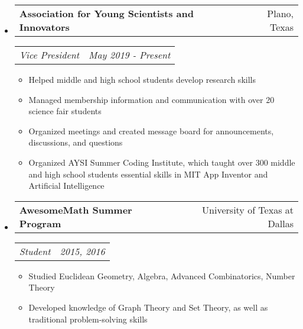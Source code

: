 \documentclass[letterpaper,11pt]{article}
\makeatletter
\newcommand{\resitem}[1]{\item #1 \vspace{-3pt}}
\newcommand{\ressubheading}[4]{
	\begin{tabular*}{7.0in}{l@{\extracolsep{\fill}}r}
			#1 & #2 \\
	\end{tabular*}
	\begin{tabular*}{7.0in}{l@{\extracolsep{\fill}}r}
			\textit{#3} & \textit{#4} \\
	\end{tabular*}\vspace{-6pt}}
\makeatother
\begin{document}
\begin{itemize}
\item
	\ressubheading{\textbf{Association for Young Scientists and Innovators}}{Plano, Texas}{Vice President}{May 2019 - Present}
		\begin{itemize}
			\resitem{Helped middle and high school students develop research skills}
			\resitem{Managed membership information and communication with over 20 science fair students}
			\resitem{Organized meetings and created message board for announcements, discussions, and questions}
			\resitem{Organized AYSI Summer Coding Institute, which taught over 300 middle and high school students essential skills in MIT App Inventor and Artificial Intelligence}
		\end{itemize}


\item
	\ressubheading{\textbf{AwesomeMath Summer Program}}{University of Texas at Dallas}{Student}{2015, 2016}
		\begin{itemize}
			\resitem{Studied Euclidean Geometry, Algebra, Advanced Combinatorics, Number Theory}
			\resitem{Developed knowledge of Graph Theory and Set Theory, as well as traditional problem-solving skills}
		\end{itemize}




\end{itemize}
\end{document}
